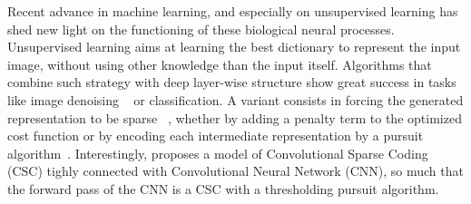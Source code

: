 \documentclass[a4paper, 11pt, draft]{article} %
\begin{document}
Recent advance in machine learning, and especially on unsupervised learning has shed new light on the functioning of these biological neural processes. 
Unsupervised learning aims at learning the best dictionary to represent the input image, without using other knowledge than the input itself. Algorithms that combine such strategy with deep layer-wise structure show great success in tasks like image denoising ~\citep{vincent2008extracting} or  classification. A variant consists in forcing the generated representation to be sparse ~\citep{DBLP:journals/corr/MakhzaniF13}, whether by adding a penalty term to the optimized cost function or by encoding each intermediate representation by a pursuit algorithm~\citep{papyan2016convolutional}. Interestingly, \citep{papyan2016convolutional} proposes a model of Convolutional Sparse Coding (CSC) tighly connected with Convolutional Neural Network (CNN), so much that the forward pass of the CNN is a CSC with a thresholding pursuit algorithm.
\end{document}
